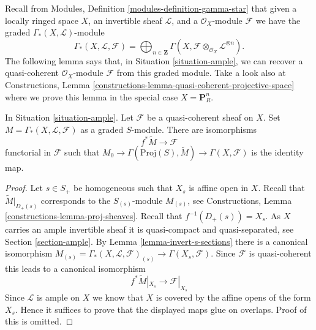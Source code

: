 \noindent
Recall from Modules, Definition \ref{modules-definition-gamma-star}
that given a locally ringed space $X$, an invertible sheaf $\mathcal{L}$,
and a $\mathcal{O}_X$-module $\mathcal{F}$ we have the graded
$\Gamma_*(X, \mathcal{L})$-module
$$
\Gamma_*(X, \mathcal{L}, \mathcal{F}) =
\bigoplus\nolimits_{n \in \mathbf{Z}}
\Gamma(X, \mathcal{F} \otimes_{\mathcal{O}_X} \mathcal{L}^{\otimes n}).
$$
The following lemma says that, in Situation \ref{situation-ample},
we can recover a quasi-coherent $\mathcal{O}_X$-module $\mathcal{F}$
from this graded module. Take a look also at
Constructions, Lemma \ref{constructions-lemma-quasi-coherent-projective-space}
where we prove this lemma in the special case $X = \mathbf{P}^n_R$.

\begin{lemma}
\label{lemma-ample-quasi-coherent}
In Situation \ref{situation-ample}.
Let $\mathcal{F}$ be a quasi-coherent sheaf on $X$.
Set $M = \Gamma_*(X, \mathcal{L}, \mathcal{F})$ as a graded $S$-module.
There are isomorphisms
$$
f^*\widetilde{M} \longrightarrow \mathcal{F}
$$
functorial in $\mathcal{F}$ such that
$M_0 \to \Gamma(\text{Proj}(S), \widetilde{M}) \to \Gamma(X, \mathcal{F})$
is the identity map.
\end{lemma}

\begin{proof}
Let $s \in S_{+}$ be homogeneous such that $X_s$ is affine open in $X$.
Recall that $\widetilde{M}|_{D_{+}(s)}$ corresponds to the
$S_{(s)}$-module $M_{(s)}$, see
Constructions, Lemma \ref{constructions-lemma-proj-sheaves}.
Recall that $f^{-1}(D_{+}(s)) = X_s$.
As $X$ carries an ample invertible sheaf it is quasi-compact and
quasi-separated, see Section \ref{section-ample}.
By Lemma \ref{lemma-invert-s-sections} there is a canonical isomorphism
$M_{(s)} = \Gamma_*(X, \mathcal{L}, \mathcal{F})_{(s)} \to
\Gamma(X_s, \mathcal{F})$.
Since $\mathcal{F}$ is quasi-coherent this leads to
a canonical isomorphism
$$
f^*\widetilde{M}|_{X_s} \to \mathcal{F}|_{X_s}
$$
Since $\mathcal{L}$ is ample on $X$ we know that $X$ is covered
by the affine opens of the form $X_s$. Hence it suffices to prove
that the displayed maps glue on overlaps. Proof of this is
omitted.
\end{proof}

